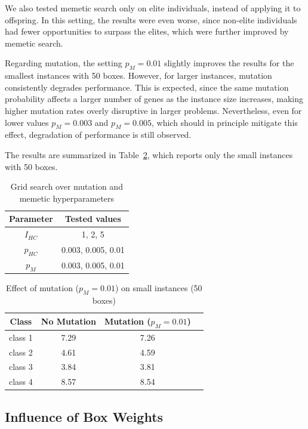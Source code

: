 We also tested memetic search only on elite individuals, instead of applying it to offspring. 
In this setting, the results were even worse, since non-elite individuals had fewer opportunities 
to surpass the elites, which were further improved by memetic search.

Regarding mutation, the setting $p_M = 0.01$ slightly improves the results for the smallest instances with 50 boxes. 
However, for larger instances, mutation consistently degrades performance. 
This is expected, since the same mutation probability affects a larger number of genes as the instance size increases, making higher mutation rates overly disruptive in larger problems. 
Nevertheless, even for lower values $p_M = 0.003$ and $p_M = 0.005$, which should in principle mitigate this effect, degradation of performance is still observed.

The results are summarized in Table~\ref{tab:mutation-results}, which reports only the small instances with 50 boxes.

\begin{table}[htbp]
\centering
\caption{Grid search over mutation and memetic hyperparameters}
\label{tab:mutation-memetic-parameters}
\begin{tabular}{|c|c|}
\hline
Parameter & Tested values \\ \hline
$I_{HC}$ & 1, 2, 5 \\ \hline
$p_{HC}$ & 0.003, 0.005, 0.01 \\ \hline
$p_M$ & 0.003, 0.005, 0.01 \\ \hline
\end{tabular}
\end{table}

\begin{table}[htbp]
\centering
\caption{Effect of mutation ($p_M = 0.01$) on small instances (50 boxes)}
\label{tab:mutation-results}
\begin{tabular}{|c|c|c|c|}
\hline
Class & No Mutation & Mutation ($p_M = 0.01$) \\ \hline
class 1 & 7.29 & 7.26 \\ \hline
class 2 & 4.61 & 4.59 \\ \hline
class 3 & 3.84 & 3.81 \\ \hline
class 4 & 8.57 & 8.54 \\ \hline
\end{tabular}
\end{table}

\subsection{Influence of Box Weights}

